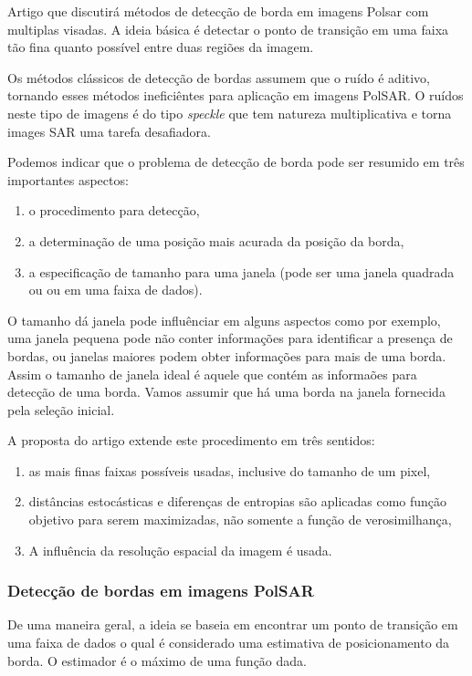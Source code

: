 Artigo que discutirá métodos de detecção de borda em imagens Polsar com multiplas visadas. A ideia básica é detectar o ponto de transição em uma faixa tão fina quanto possível entre duas regiões da imagem.

Os métodos clássicos de detecção de bordas assumem que o ruído é aditivo, tornando esses métodos ineficiêntes para aplicação em imagens PolSAR. O ruídos neste tipo de imagens é do tipo {\it speckle} que tem natureza multiplicativa e torna images SAR uma tarefa desafiadora.

Podemos indicar que o problema de detecção de borda pode ser resumido em três importantes aspectos:
\begin{enumerate}
	\item o procedimento para detecção,
	\item a determinação de uma posição mais acurada da posição da borda,
	\item a especificação de tamanho para uma janela (pode ser uma janela quadrada ou ou em uma faixa de dados). 
\end{enumerate}

O tamanho dá janela pode influênciar em alguns aspectos como por exemplo, uma janela pequena pode não conter informações para identificar a presença de bordas, ou janelas maiores podem obter informações para mais de uma borda. Assim o tamanho de janela ideal é aquele que contém as informaões para detecção de uma borda. Vamos assumir que há uma borda na janela fornecida pela seleção inicial.

A proposta do artigo extende este procedimento em três sentidos:
\begin{enumerate}
	\item as mais finas faixas possíveis usadas, inclusive do tamanho de um pixel,
	\item distâncias estocásticas e diferenças de entropias são aplicadas como função objetivo para serem maximizadas, não somente a função de verosimilhança,
	\item A influência da resolução espacial da imagem é usada. 
\end{enumerate}

\subsubsection{Detecção de bordas em imagens PolSAR}

De uma maneira geral, a ideia se baseia em encontrar um ponto de transição em uma faixa de dados o qual é considerado uma estimativa de posicionamento da borda. O estimador é o máximo de uma função dada. 

